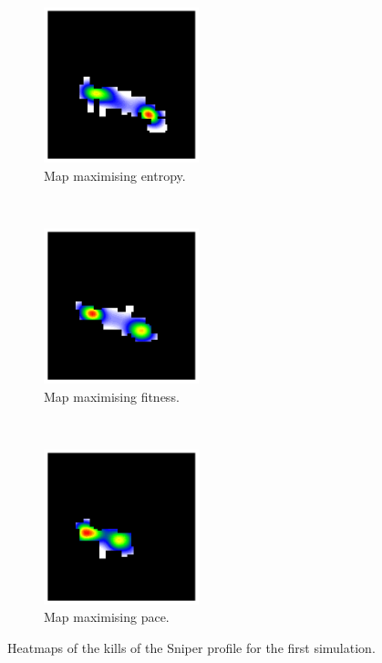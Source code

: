 \begin{figure}[H]
    \centering
    \begin{subfigure}[t]{0.3\textwidth}
        \centering
        \includegraphics[height=4.5cm]{Images/images/experiment_two/best_entropy_pop_0/kills_bot_1.png}
        \caption{Map maximising entropy.}
    \end{subfigure}%
    ~ 
    \begin{subfigure}[t]{0.3\textwidth}
        \centering
        \includegraphics[height=4.5cm]{Images/images/experiment_two/best_fitness_pop_0/kills_bot_1.png}
        \caption{Map maximising fitness.}
    \end{subfigure}
    ~ 
    \begin{subfigure}[t]{0.3\textwidth}
        \centering
        \includegraphics[height=4.5cm]{Images/images/experiment_two/best_pace_pop_0/kills_bot_1.png}
        \caption{Map maximising pace.}
    \end{subfigure}
    \caption{Heatmaps of the kills of the Sniper profile for the first simulation.}
\end{figure}

